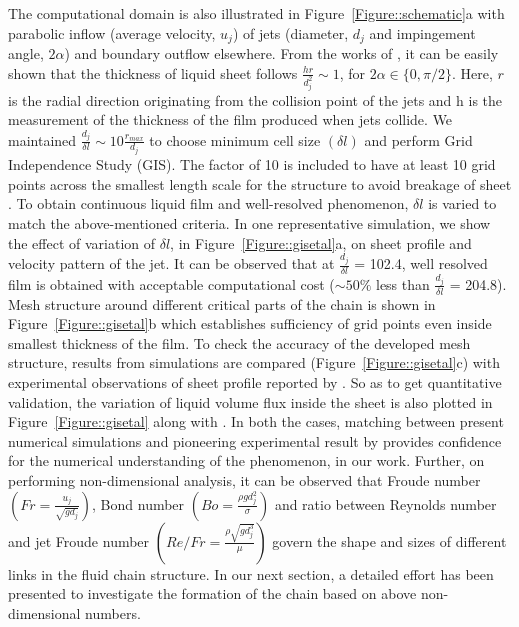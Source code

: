 \documentclass{jfm}
\begin{document}
The computational domain is also illustrated in Figure~\ref{Figure::schematic}a with parabolic inflow (average velocity, $u_j$) of jets (diameter, $d_j$ and impingement angle, $2\alpha$) and boundary outflow elsewhere. From the works of \cite{choo2001parametric}, it can be easily shown that the thickness of liquid sheet follows $\frac{hr}{d_j^2} \sim 1$, for $2\alpha \in \{0,\pi/2\}$.  Here, $r$ is the radial direction originating from the collision point of the jets and h is the measurement of the thickness of the film produced when jets collide. We maintained $\frac{d_j}{\delta l} \sim 10\frac{r_{max}}{d_j}$ to choose minimum cell size $\left(\delta l\right)$ and perform Grid Independence Study (GIS). The factor of 10 is included to have at least 10 grid points\citep{ling2015multiscale} across the smallest length scale for the structure to avoid breakage of sheet \citep{chen2013high}. To obtain continuous liquid film and well-resolved phenomenon, $\delta l$ is varied to match the above-mentioned criteria. In one representative simulation, we show the effect of variation of $\delta l$, in Figure~\ref{Figure::gisetal}a, on sheet profile and velocity pattern of the jet. It can be observed that at $\frac{d_j}{\delta l}$ = 102.4, well resolved film is obtained with acceptable computational cost ($\sim 50\%$ less than $\frac{d_j}{\delta l}$ = 204.8). Mesh structure around different critical parts of the chain is shown in Figure~\ref{Figure::gisetal}b which establishes sufficiency of grid points even inside smallest thickness of the film. To check the accuracy of the developed mesh structure, results from simulations are compared (Figure~\ref{Figure::gisetal}c) with experimental observations of sheet profile reported by \cite{bush2004collision}. So as to get quantitative validation, the variation of liquid volume flux inside the sheet is also plotted in Figure~\ref{Figure::gisetal} along with \cite{bush2004collision}. In both the cases, matching between present numerical simulations and pioneering experimental result by \cite{bush2004collision} provides confidence for the numerical understanding of the phenomenon, in our work. Further, on performing non-dimensional analysis, it can be observed that Froude number $\left(Fr = \frac{u_j}{\sqrt{gd_j}}\right)$, Bond number $\left(Bo = \frac{\rho gd_j^2}{\sigma}\right)$ and ratio between Reynolds number and jet Froude number $\left(Re/Fr = \frac{\rho\sqrt{gd_j^3}}{\mu}\right)$ govern the shape and sizes of different links in the fluid chain structure. In our next section, a detailed effort has been presented to investigate the formation of the chain based on above non-dimensional numbers.
\end{document}
